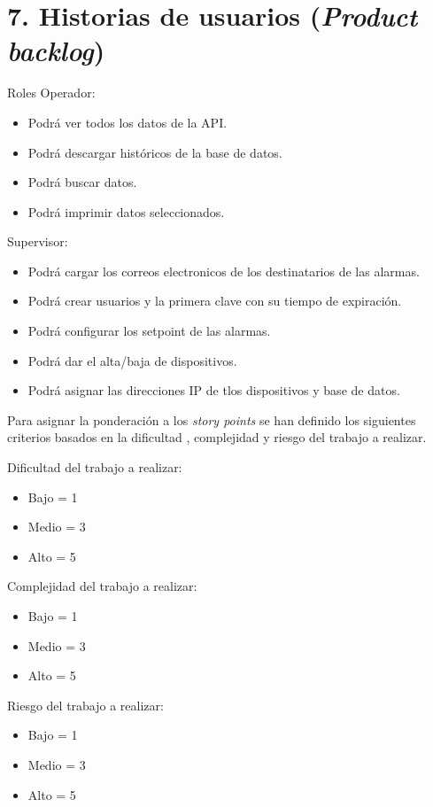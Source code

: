\documentclass[
11pt, %
codirector, %
]{charter}
\begin{document}
\section{7. Historias de usuarios (\textit{Product backlog})}
\label{sec:backlog}
Roles
Operador:
\begin{itemize}
 \item Podrá ver todos los datos de la API. 
 \item Podrá descargar históricos de la base de datos.
 \item Podrá buscar datos.
 \item Podrá imprimir datos seleccionados.
\end{itemize}
Supervisor:
\begin{itemize}
\item Podrá cargar los correos electronicos de los destinatarios de las alarmas.
\item Podrá crear usuarios y la primera clave con su tiempo de expiración.
\item Podrá configurar los setpoint de las alarmas.
\item Podrá dar el alta/baja de dispositivos.
\item Podrá asignar las direcciones IP de tlos dispositivos y base de datos.
\end{itemize}


Para asignar la ponderación a los \textit {story points} se han definido los siguientes criterios basados en la dificultad , complejidad y riesgo del trabajo a realizar. \par
Dificultad del trabajo a realizar:
\begin{itemize}
 \item Bajo  = 1 
 \item Medio = 3
 \item Alto = 5
\end{itemize}

Complejidad del trabajo a realizar:
\begin{itemize}
 \item Bajo  = 1 
 \item Medio = 3
 \item Alto = 5
\end{itemize}

Riesgo del trabajo a realizar:

\begin{itemize}
 \item Bajo  = 1 
 \item Medio = 3
 \item Alto = 5
\end{itemize}
\end{document}
